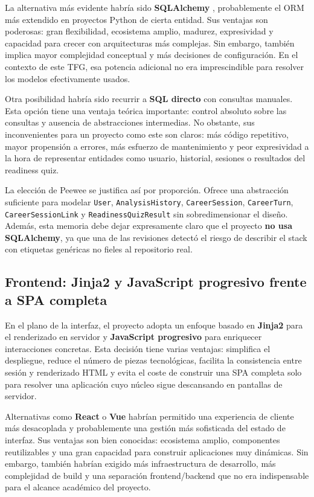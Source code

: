 La alternativa más evidente habría sido \textbf{SQLAlchemy} \cite{sqlalchemy}, probablemente el ORM más extendido en proyectos Python de cierta entidad. Sus ventajas son poderosas: gran flexibilidad, ecosistema amplio, madurez, expresividad y capacidad para crecer con arquitecturas más complejas. Sin embargo, también implica mayor complejidad conceptual y más decisiones de configuración. En el contexto de este TFG, esa potencia adicional no era imprescindible para resolver los modelos efectivamente usados.

Otra posibilidad habría sido recurrir a \textbf{SQL directo} con consultas manuales. Esta opción tiene una ventaja teórica importante: control absoluto sobre las consultas y ausencia de abstracciones intermedias. No obstante, sus inconvenientes para un proyecto como este son claros: más código repetitivo, mayor propensión a errores, más esfuerzo de mantenimiento y peor expresividad a la hora de representar entidades como usuario, historial, sesiones o resultados del readiness quiz.

La elección de Peewee se justifica así por proporción. Ofrece una abstracción suficiente para modelar \texttt{User}, \texttt{AnalysisHistory}, \texttt{CareerSession}, \texttt{CareerTurn}, \texttt{CareerSessionLink} y \texttt{ReadinessQuizResult} sin sobredimensionar el diseño. Además, esta memoria debe dejar expresamente claro que el proyecto \textbf{no usa SQLAlchemy}, ya que una de las revisiones detectó el riesgo de describir el stack con etiquetas genéricas no fieles al repositorio real.

\subsection{Frontend: Jinja2 y JavaScript progresivo frente a SPA completa}

En el plano de la interfaz, el proyecto adopta un enfoque basado en \textbf{Jinja2} \cite{jinja2} para el renderizado en servidor y \textbf{JavaScript progresivo} para enriquecer interacciones concretas. Esta decisión tiene varias ventajas: simplifica el despliegue, reduce el número de piezas tecnológicas, facilita la consistencia entre sesión y renderizado HTML y evita el coste de construir una SPA completa solo para resolver una aplicación cuyo núcleo sigue descansando en pantallas de servidor.

Alternativas como \textbf{React} o \textbf{Vue} \cite{react,vue} habrían permitido una experiencia de cliente más desacoplada y probablemente una gestión más sofisticada del estado de interfaz. Sus ventajas son bien conocidas: ecosistema amplio, componentes reutilizables y una gran capacidad para construir aplicaciones muy dinámicas. Sin embargo, también habrían exigido más infraestructura de desarrollo, más complejidad de build y una separación frontend/backend que no era indispensable para el alcance académico del proyecto.

